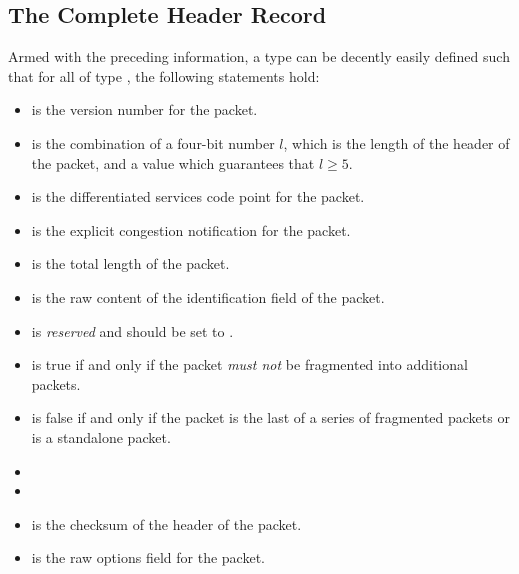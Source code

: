 \documentclass{report}
\begin{document}
\begin{itemize}
\section{The Complete Header Record}
Armed with the preceding information, a type  can be decently easily defined such that for all  of type , the following statements hold:
\begin{itemize}
	\item {}  is the version number for the  packet.
	\item {}  is the combination of a four-bit number \(l\), which is the length of the header of the  packet, and a value which guarantees that \(l \geq 5\).
	\item {}  is the differentiated services code point for the  packet.
	\item {}  is the explicit congestion notification for the  packet.
	\item {}  is the total length of the  packet.
	\item {}  is the raw content of the identification field of the  packet.
	\item {}  is \emph{reserved} and should be set to .
	\item {}  is true if and only if the  packet \emph{must not} be fragmented into additional packets.
	\item {}  is false if and only if the  packet is the last of a series of fragmented packets or is a standalone packet.
	\item {} 
	\item {} 
	\item {}  is the checksum of the header of the  packet.
	\item {}  is the raw options field for the  packet.
\end{itemize}


\end{itemize}
\end{document}
